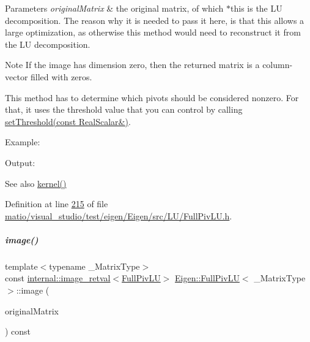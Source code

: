 \begin{DoxyParams}{Parameters}
{\em original\+Matrix} & the original matrix, of which $\ast$this is the LU decomposition. The reason why it is needed to pass it here, is that this allows a large optimization, as otherwise this method would need to reconstruct it from the LU decomposition.\\
\hline
\end{DoxyParams}
\begin{DoxyNote}{Note}
If the image has dimension zero, then the returned matrix is a column-\/vector filled with zeros.

This method has to determine which pivots should be considered nonzero. For that, it uses the threshold value that you can control by calling \hyperlink{group___l_u___module_a414592d82de98f5bd075965caf56d681}{set\+Threshold(const Real\+Scalar\&)}.
\end{DoxyNote}
Example\+: 
\begin{DoxyCodeInclude}
\end{DoxyCodeInclude}
 Output\+: 
\begin{DoxyVerbInclude}
\end{DoxyVerbInclude}


\begin{DoxySeeAlso}{See also}
\hyperlink{group___l_u___module_a70f52eeb2cd07dfbf790fce106fb4015}{kernel()} 
\end{DoxySeeAlso}


Definition at line \hyperlink{matio_2visual__studio_2test_2eigen_2_eigen_2src_2_l_u_2_full_piv_l_u_8h_source_l00215}{215} of file \hyperlink{matio_2visual__studio_2test_2eigen_2_eigen_2src_2_l_u_2_full_piv_l_u_8h_source}{matio/visual\+\_\+studio/test/eigen/\+Eigen/src/\+L\+U/\+Full\+Piv\+L\+U.\+h}.

\mbox{\label{group___l_u___module_a0893985d2dab367baa6e57c6fd0c4956}} 
\subparagraph{\texorpdfstring{image()}{image()}\hspace{0.1cm}{\footnotesize\ttfamily [2/2]}}
{\footnotesize\ttfamily template$<$typename \+\_\+\+Matrix\+Type$>$ \\
const \hyperlink{struct_eigen_1_1internal_1_1image__retval}{internal\+::image\+\_\+retval}$<$\hyperlink{group___l_u___module_class_eigen_1_1_full_piv_l_u}{Full\+Piv\+LU}$>$ \hyperlink{group___l_u___module_class_eigen_1_1_full_piv_l_u}{Eigen\+::\+Full\+Piv\+LU}$<$ \+\_\+\+Matrix\+Type $>$\+::image (\begin{DoxyParamCaption}\item[{const Matrix\+Type \&}]{original\+Matrix }\end{DoxyParamCaption}) const\hspace{0.3cm}{\ttfamily [inline]}}

